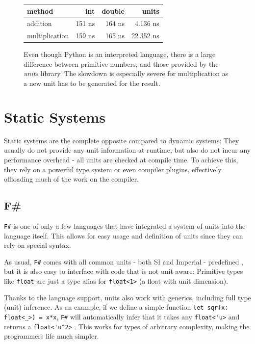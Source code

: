 \documentclass[12pt,oneside,a4paper]{scrbook}
\begin{document}
\begin{figure}
\begin{tabular}{lrrr}
method          & int    & double  & units \\
\midrule
addition        & 151 ns &  164 ns    &    4.136 ns \\
multiplication  & 159 ns &  165 ns    &   22.352 ns
\end{tabular}
\caption{Even though Python is an interpreted language, there is a large difference between primitive numbers, and those provided by the \emph{units} library. The slowdown is especially severe for multiplication as a new unit has to be generated for the result.}
\label{bench:python_units}
\end{figure}



\section{Static Systems}
Static systems are the complete opposite compared to dynamic systems: They usually do not provide any unit information at runtime, but also do not incur any performance overhead - all units are checked at compile time. To achieve this, they rely on a powerful type system or even compiler plugins, effectively offloading much of the work on the compiler.

\subsection{F\#}

\verb/F#/ is one of only a few languages that have integrated a system of units into the language itself. This allows for easy usage and definition of units since they can rely on special syntax.
\citep{Kennedy08:1}

As usual, \verb/F#/ comes with all common units - both SI and Imperial - predefined \citep{Kennedy08:2}, but it is also easy to interface with code that is not unit aware: Primitive types like \verb/float/ are just a type alias for \verb/float<1>/ (a float with unit dimension).

Thanks to the language support, units also work with generics, including full type (unit) inference. As an example, if we define a simple function \verb/let sqr(x: float<_>) = x*x/, \verb/F#/ will automatically infer that it takes any \verb/float<'u>/ and returns a \verb/float<'u^2>/ \citep{Kennedy08:3}. This works for types of arbitrary complexity, making the programmers life much simpler.
\end{document}
